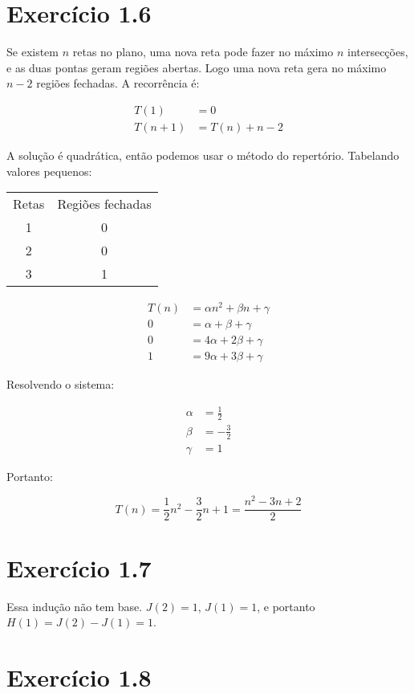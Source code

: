 \documentclass[10pt]{book}
\begin{document}
\section{Exercício 1.6}

Se existem $n$ retas no plano, uma nova reta pode fazer no máximo $n$ intersecções, e as duas pontas geram regiões abertas. Logo uma nova reta gera no máximo $n-2$ regiões fechadas. A recorrência é:

\begin{align*}
 T(1)&=0 \\
 T(n+1)&=T(n)+n-2 
\end{align*}

 A solução é quadrática, então podemos usar o método do repertório. Tabelando valores pequenos: 

\begin{tabular}{c c}
Retas   &Regiões fechadas        \\
1       &0       \\
2       &0       \\
3       &1      
\end{tabular} 

\begin{align*}
 T(n)&=\alpha n^2+\beta n+\gamma \\
 0&=\alpha+\beta+\gamma \\
 0&=4\alpha+2\beta+\gamma \\
 1&=9\alpha+3\beta+\gamma 
\end{align*}

Resolvendo o sistema: 

\begin{align*}
  \alpha&=\frac{1}{2} \\
  \beta&=-\frac{3}{2} \\
  \gamma&=1 
\end{align*}

Portanto: 

\[ T(n)=\frac{1}{2}n^2-\frac{3}{2}n+1=\frac{n^2-3n+2}{2} \]

\section{Exercício 1.7}
 
Essa indução não tem base. $J(2)=1$, $J(1)=1$, e portanto $H(1)=J(2)-J(1)=1$.

\section{Exercício 1.8}
\end{document}
